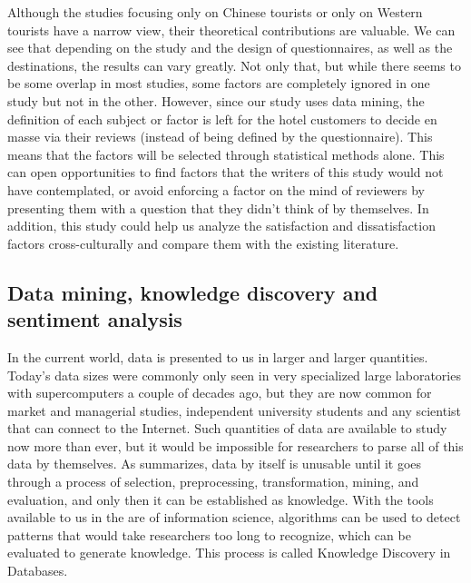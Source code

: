 Although the studies focusing only on Chinese tourists or only on Western tourists have a narrow view, their theoretical contributions are valuable. We can see that depending on the study and the design of questionnaires, as well as the destinations, the results can vary greatly. Not only that, but while there seems to be some overlap in most studies, some factors are completely ignored in one study but not in the other. However, since our study uses data mining, the definition of each subject or factor is left for the hotel customers to decide en masse via their reviews (instead of being defined by the questionnaire). This means that the factors will be selected through statistical methods alone. This can open opportunities to find factors that the writers of this study would not have contemplated, or avoid enforcing a factor on the mind of reviewers by presenting them with a question that they didn't think of by themselves. In addition, this study could help us analyze the satisfaction and dissatisfaction factors cross-culturally and compare them with the existing literature.

\subsection{Data mining, knowledge discovery and sentiment analysis}\label{theory_data}

In the current world, data is presented to us in larger and larger quantities. Today's data sizes were commonly only seen in very specialized large laboratories with supercomputers a couple of decades ago, but they are now common for market and managerial studies, independent university students and any scientist that can connect to the Internet. Such quantities of data are available to study now more than ever, but it would be impossible for researchers to parse all of this data by themselves. As \cite{fayyad1996data} summarizes, data by itself is unusable until it goes through a process of selection, preprocessing, transformation, mining, and evaluation, and only then it can be established as knowledge. With the tools available to us in the are of information science, algorithms can be used to detect patterns that would take researchers too long to recognize, which can be evaluated to generate knowledge. This process is called Knowledge Discovery in Databases. 

